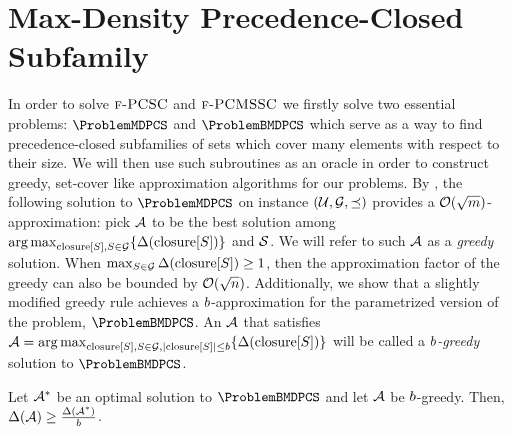 \section{Max-Density Precedence-Closed Subfamily} \label{ea:sec:MDPCS}

In order to solve $\textup{\textsc{f-PCSC}}$ and $\textup{\textsc{f-PCMSSC}}$ we firstly solve two essential problems: $\ProblemMDPCS$ and $\ProblemBMDPCS$ which serve as a way to find precedence-closed subfamilies of sets which cover many elements with respect to their size. We will then use such subroutines as an oracle in order to construct greedy, set-cover like approximation algorithms for our problems.
By \cite{PCMSSC}, the following solution to $\ProblemMDPCS$ on instance $\mathopen{}\left( \mathcal{U},\mathcal{G},\preceq \right)$ provides a $\mathcal{O}\mathopen{}\left( \sqrt{m} \right)$-approximation: pick $\mathcal{A}$ to be the best solution among
$\mathopen{}\operatorname*{arg\,max}_{\operatorname{closure}[S], S\in\mathcal{G}} \mathopen{}\left\{ \Delta\mathopen{}\left( \operatorname{closure}[S] \right) \right\}$ and $\mathcal{S}$.
We will refer to such $\mathcal{A}$ as a \emph{greedy} solution.
%
When $\max_{S \in \mathcal{G}} \Delta\mathopen{}\left( \operatorname{closure}[S] \right) \geq 1$, then the approximation factor of the greedy can also be bounded by $\mathcal{O}\mathopen{}\left( \sqrt{n} \right)$.
Additionally, we show that a slightly modified greedy rule achieves a $b$-approximation for the parametrized version of the problem, $\ProblemBMDPCS$.
An $\mathcal{A}$ that satisfies
    $
    \mathcal{A}=\mathopen{}\operatorname*{arg\,max}_{\operatorname{closure}[S], S \in \mathcal{G}, \mathopen{}\left| \operatorname{closure}[S] \right|\leq b} \mathopen{}\left\{ \Delta\mathopen{}\left( \operatorname{closure}[S] \right) \right\}
    $
will be called a \emph{$b$-greedy} solution to $\ProblemBMDPCS$.
\begin{theorem}\label{ea:thm:BMDPCS-greedy}
    Let $\mathcal{A}^*$ be an optimal solution to $\ProblemBMDPCS$ and let $\mathcal{A}$ be $b$-greedy.
    Then, $\Delta\mathopen{}\left( \mathcal{A} \right) \geq \frac{\Delta\mathopen{}\left( \mathcal{A}^* \right)}{b}$.
\end{theorem}
